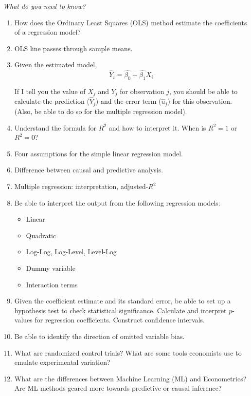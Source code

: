 \documentclass{./../../Latex/handout}
\begin{document}
 \textit{What do you need to know?}
\begin{enumerate}
\item How does the Ordinary Least Squares (OLS) method estimate the coefficients of a regression model? 
\item OLS line passes through sample means. 
\item Given the estimated model, 
$$ \hat{Y}_i = \hat{\beta_0} + \hat{\beta_1} X_i $$

If I tell you the value of $X_j$ and $Y_j$ for observation $j$, you should be able to calculate the prediction ($\hat{Y}_j$) and the error term ($\hat{u}_j$) for this observation. (Also, be able to do so for the multiple regression model).
\item Understand the formula for $R^2$ and how to interpret it. When is $R^2=1$ or $R^2=0$? 
\item Four assumptions for the simple linear regression model. 
\item Difference between causal and predictive analysis. 
\item Multiple regression: interpretation, adjusted-$R^2$
\item Be able to interpret the output from the following regression models:
\begin{itemize}
  \item Linear
  \item Quadratic
  \item Log-Log, Log-Level, Level-Log
  \item Dummy variable 
  \item Interaction terms
\end{itemize}
\item Given the coefficient estimate and its standard error, be able to set up a hypothesis test to check statistical significance. Calculate and interpret $p$-values for regression coefficients. Construct confidence intervals. 
\item Be able to identify the direction of omitted variable bias. 
\item What are randomized control trials? What are some tools economists use to emulate experimental variation?
\item What are the differences between Machine Learning (ML) and Econometrics? Are ML methods geared more towards predictive or causal inference?
\end{enumerate}
\end{document}
